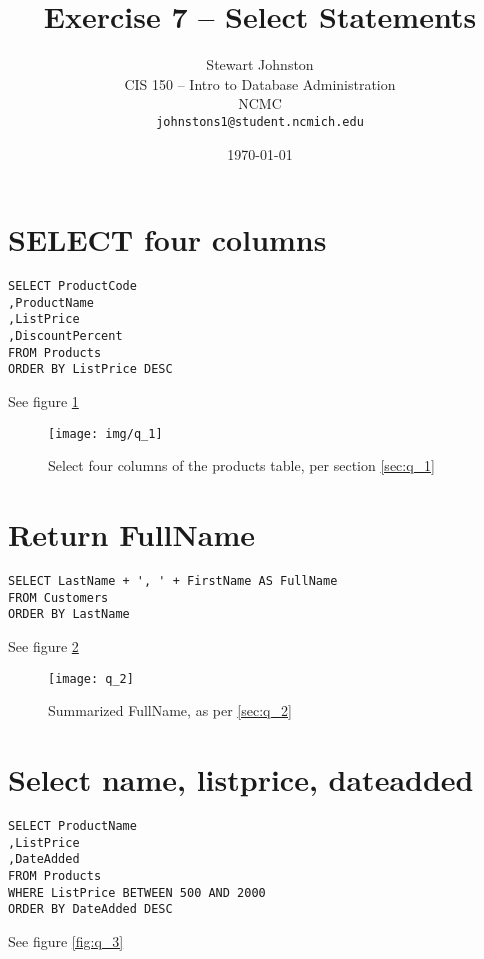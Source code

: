 \documentclass{article}
\title{Exercise 7 -- Select Statements}
\author{Stewart Johnston\\
  {CIS 150 -- Intro to Database Administration}\\
  {NCMC}\\
  {\texttt{johnstons1@student.ncmich.edu}}
}
\date{\today}
\begin{document}

\maketitle

\tableofcontents
\listoffigures

\section{SELECT four columns}

\begin{lstlisting}[float]
SELECT ProductCode
,ProductName
,ListPrice
,DiscountPercent
FROM Products
ORDER BY ListPrice DESC
\end{lstlisting}\label{sec:q_1}
See figure \ref{fig:q_1}

\begin{figure}[H]\centering
	\caption{Select four columns of the products table, per section
	\ref{sec:q_1}}
	\texttt{[image: img/q\_1]}
	\label{fig:q_1}
\end{figure}

\section{Return FullName}

\begin{lstlisting}[float]
SELECT LastName + ', ' + FirstName AS FullName
FROM Customers
ORDER BY LastName
\end{lstlisting}\label{sec:q_2}
See figure \ref{fig:q_2}

\begin{figure}[H]\centering
	\caption{Summarized FullName, as per \ref{sec:q_2}}
	\texttt{[image: q\_2]}
	\label{fig:q_2}
\end{figure}

\section{Select name, listprice, dateadded}

\begin{lstlisting}[float]
SELECT ProductName
,ListPrice
,DateAdded
FROM Products
WHERE ListPrice BETWEEN 500 AND 2000
ORDER BY DateAdded DESC
\end{lstlisting}\label{sec:q_3}
See figure \ref{fig:q_3}
\end{document}
